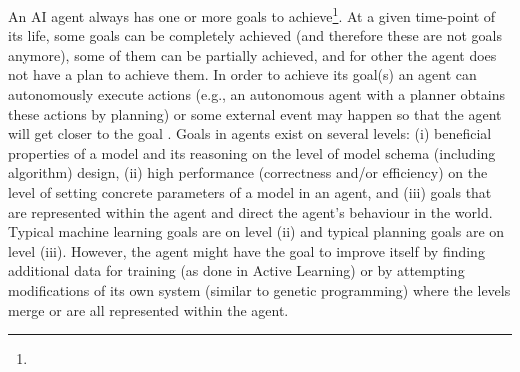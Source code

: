 An AI agent always has one or more goals to achieve\footnote{}. At a given
time-point of its life, some goals can be completely
achieved (and therefore these are not goals anymore), some of them can be
partially achieved, and for other the agent does not have a plan to
achieve them. In order to
achieve its goal(s) an  agent can autonomously execute actions  (e.g.,
an autonomous agent with a planner obtains these actions by planning)
or some external event may happen so that the agent will get closer to
the goal .
Goals in agents exist on several levels: (i) beneficial properties of
a model and its reasoning on the level of model schema (including
algorithm) design, (ii) high performance (correctness and/or
efficiency) on the level of setting concrete parameters of a model in
an agent, and (iii) goals that are represented within the agent and
direct the agent's behaviour in the world.  Typical machine
learning goals are on level (ii) and typical planning goals are on
level (iii).  However, the agent might have the goal to improve itself
by finding additional data for training (as done in Active Learning)
or by attempting modifications of its own system (similar to genetic
programming) where the levels merge or are all represented within the
agent.


